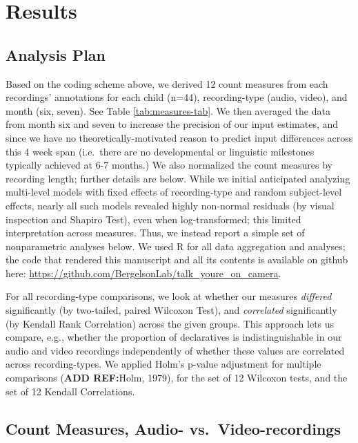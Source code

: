 \documentclass[floatsintext,man]{apa6}
\theoremstyle{definition}
\theoremstyle{definition}
\theoremstyle{definition}
\theoremstyle{remark}
\begin{document}
\section{Results}\label{results}

\subsection{Analysis Plan}\label{analysis-plan}

Based on the coding scheme above, we derived 12 count measures from each
recordings' annotations for each child (n=44), recording-type (audio,
video), and month (six, seven). See Table \ref{tab:measures-tab}. We
then averaged the data from month six and seven to increase the
precision of our input estimates, and since we have no
theoretically-motivated reason to predict input differences across this
4 week span (i.e.~there are no developmental or linguistic milestones
typically achieved at 6-7 months.) We also normalized the count measures
by recording length; further details are below. While we initial
anticipated analyzing multi-level models with fixed effects of
recording-type and random subject-level effects, nearly all such models
revealed highly non-normal residuals (by visual inspection and Shapiro
Test), even when log-transformed; this limited interpretation across
measures. Thus, we instead report a simple set of nonparametric analyses
below. We used R for all data aggregation and analyses; the code that
rendered this manuscript and all its contents is available on github
here: \url{https://github.com/BergelsonLab/talk_youre_on_camera}.

For all recording-type comparisons, we look at whether our measures
\emph{differed} significantly (by two-tailed, paired Wilcoxon Test), and
\emph{correlated} significantly (by Kendall Rank Correlation) across the
given groups. This approach lets us compare, e.g., whether the
proportion of declaratives is indistinguishable in our audio and video
recordings independently of whether these values are correlated across
recording-types. We applied Holm's p-value adjustment for multiple
comparisons (\textbf{ADD REF:}Holm, 1979), for the set of 12 Wilcoxon
tests, and the set of 12 Kendall Correlations.

\subsection{Count Measures, Audio-
vs.~Video-recordings}\label{count-measures-audio--vs.video-recordings}
\end{document}
